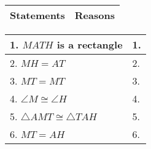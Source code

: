 \begin{tabularx}{\textwidth}{|Y|Y|}
\hline
\textbf{Statements} & \textbf{Reasons}  \\
\hline
\end{tabularx} 
\begin{tabularx}{\textwidth}{|X|X|}
\hline 
1. \(MATH\) is a rectangle & 1. \\
 \hline 
 2. \(MH = AT\) & 2. \\
 \hline
 3. $ MT = MT $ & 3. \\
 \hline
 4. $ \angle{M} \cong \angle{H} $ & 4. \\
 \hline
 5. $ \bigtriangleup{AMT} \cong \bigtriangleup{TAH} $ & 5. \\
 \hline
 6. \(MT = AH\) & 6. \\
 \hline
\end{tabularx} 
